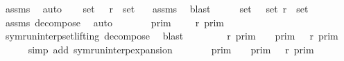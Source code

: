 \begin{isabellebody}
\ assms\ \isamarkupfalse%
\ auto\isanewline
\ \ \isamarkupfalse%
\ {\isacartoucheopen}set\ {\isacharparenleft}{\isasymGamma}\ {\isacharat}\ {\isasymGamma}\isactrlsub r{\isacharparenright}\ {\isacharequal}\ set\ {\isasymGamma}{\isacharprime}{\isacartoucheclose}\ \isamarkupfalse%
\ assms\ \isamarkupfalse%
\ blast\isanewline
\ \ \isamarkupfalse%
\ \isamarkupfalse%
\ {\isacartoucheopen}{\isacharparenleft}set\ {\isasymGamma}{\isacharparenright}\ {\isasymunion}\ {\isacharparenleft}set\ {\isasymGamma}\isactrlsub r{\isacharparenright}\ {\isacharequal}\ set\ {\isasymGamma}{\isacharprime}{\isacartoucheclose}\ \isamarkupfalse%
\ assms\ decompose\ \isamarkupfalse%
\ auto\isanewline
\ \ \isamarkupfalse%
\ \isamarkupfalse%
\ {\isacartoucheopen}{\isasymlbrakk}{\isasymlbrakk}\ {\isasymGamma}{\isacharprime}\ {\isasymrbrakk}{\isasymrbrakk}\isactrlsub p\isactrlsub r\isactrlsub i\isactrlsub m\ {\isacharequal}\ {\isasymlbrakk}{\isasymlbrakk}\ {\isasymGamma}\ {\isacharat}\ {\isasymGamma}\isactrlsub r\ {\isasymrbrakk}{\isasymrbrakk}\isactrlsub p\isactrlsub r\isactrlsub i\isactrlsub m{\isacartoucheclose}\isanewline
\ \ \ \ \isamarkupfalse%
\ symrun{\isacharunderscore}interp{\isacharunderscore}set{\isacharunderscore}lifting\ decompose\ \isamarkupfalse%
\ blast\isanewline
\ \ \isamarkupfalse%
\ \isamarkupfalse%
\ {\isacartoucheopen}{\isasymlbrakk}{\isasymlbrakk}\ {\isasymGamma}\ {\isacharat}\ {\isasymGamma}\isactrlsub r\ {\isasymrbrakk}{\isasymrbrakk}\isactrlsub p\isactrlsub r\isactrlsub i\isactrlsub m\ {\isacharequal}\ {\isasymlbrakk}{\isasymlbrakk}\ {\isasymGamma}\ {\isasymrbrakk}{\isasymrbrakk}\isactrlsub p\isactrlsub r\isactrlsub i\isactrlsub m\ {\isasyminter}\ {\isasymlbrakk}{\isasymlbrakk}\ {\isasymGamma}\isactrlsub r\ {\isasymrbrakk}{\isasymrbrakk}\isactrlsub p\isactrlsub r\isactrlsub i\isactrlsub m{\isacartoucheclose}\isanewline
\ \ \ \ \isamarkupfalse%
\ {\isacharparenleft}simp\ add{\isacharcolon}\ symrun{\isacharunderscore}interp{\isacharunderscore}expansion{\isacharparenright}\isanewline
\ \ \isamarkupfalse%
\ \isamarkupfalse%
\ {\isacartoucheopen}{\isasymlbrakk}{\isasymlbrakk}\ {\isasymGamma}\ {\isasymrbrakk}{\isasymrbrakk}\isactrlsub p\isactrlsub r\isactrlsub i\isactrlsub m\ {\isasymsupseteq}\ {\isasymlbrakk}{\isasymlbrakk}\ {\isasymGamma}\ {\isasymrbrakk}{\isasymrbrakk}\isactrlsub p\isactrlsub r\isactrlsub i\isactrlsub m\ {\isasyminter}\ {\isasymlbrakk}{\isasymlbrakk}\ {\isasymGamma}\isactrlsub r\ {\isasymrbrakk}{\isasymrbrakk}\isactrlsub p\isactrlsub r\isactrlsub i\isactrlsub m{\isacartoucheclose}\ \isamarkupfalse%

\end{isabellebody}
